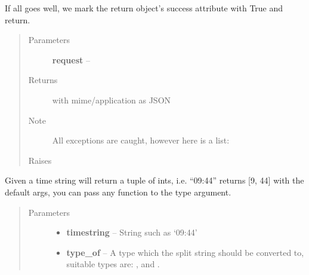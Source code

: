 \documentclass[letterpaper,10pt,english]{sphinxmanual}
\begin{document}
\begin{fulllineitems}
If all goes well, we mark the return object's success attribute with True
and return.
\begin{quote}\begin{description}
\item[{Parameters}] \leavevmode
\textbf{request} -- 

\item[{Returns}] \leavevmode
{} with mime/application as JSON

\item[{Note }] \leavevmode
All exceptions are caught, however here is a list:

\item[{Raises }] \leavevmode
{} 
 

\end{description}\end{quote}

\end{fulllineitems}


\begin{fulllineitems}
\label{timetracker:timetracker.utils.calendar_utils.parse_time}
Given a time string will return a tuple of ints,
i.e. ``09:44'' returns {[}9, 44{]} with the default args,
you can pass any function to the type argument.
\begin{quote}\begin{description}
\item[{Parameters}] \leavevmode\begin{itemize}
\item {} 
\textbf{timestring} -- String such as `09:44'

\item {} 
\textbf{type\_of} -- A type which the split string should be converted to,
suitable types are: ,  and
.

\end{itemize}

\end{description}\end{quote}

\end{fulllineitems}
\end{document}

